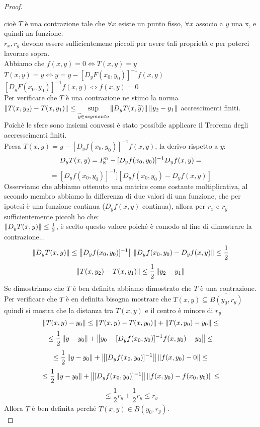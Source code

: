 \begin{theorem}
\begin{proof}
\begin{enumerate}
		\end{enumerate}
		cioè $T$ è una contrazione tale che $\forall x$ esiste un punto fisso, $\forall x$ associo a $y$ una x, e quindi na funzione.\\
		$r_x,r_y$ devono essere sufficientemene piccoli per avere tali proprietà e per poterci lavorare sopra.\\
		Abbiamo che $f(x,y)=0 \Leftrightarrow T(x,y)=y$\\
		$T(x,y)=y\Leftrightarrow y=y-[D_yF(x_0,y_0)]^{-1}f(x,y)$\\
		$[D_yF(x_0,y_0)]^{-1}f(x,y)\Leftrightarrow f(x,y)=0$\\
		Per verificare che $T$ è una contrazione ne stimo la norma\\
		$\left\|T(x,y_2)-T(x,y_1)\right\| \le \sup\limits_{\widetilde{y}\in segmento}\left\|D_yT(x,\widetilde{y})\right\|\left\|y_2-y_1\right\| $  accrescimenti finiti.\\
		Poichè le sfere sono insiemi convessi è stato possibile applicare il Teorema degli accresscimenti finiti.\\
		Presa $T(x,y) = y-[D_yf(x_0,y_0)]^{-1}f(x,y)$, la derivo rispetto a $y$:
		$$D_yT(x,y)= I_{\mathbb{R}}^m-[D_yf(x_0,y_0)]^{-1}D_yf(x,y) = $$
		$$=[D_yf(x_0,y_0)]^{-1}][D_yf(x_0,y_0)-D_yf(x,y)]$$
		Osserviamo che abbiamo ottenuto una matrice come costante moltiplicativa, al secondo membro abbiamo la differenza di due valori di una funzione, che per ipotesi è una funzione continua ($D_yf(x,y)$ continua), allora per $r_x$ e $r_y$ sufficientemente piccoli ho che:\\
		$\left\|D_yT(x,y)\right\| \le \frac{1}{2}$, è scelto questo valore poiché è comodo al fine di dimostrare la contrazione...\\
		$$\left\|D_yT(x,y)\right\| \le \left\|D_yf(x_0,y_0)]^{-1}\right\| \left\|D_yf(x_0,y_0)-D_yf(x,y)\right\|\le\frac{1}{2} $$  
		$$\left\|T(x,y_2)-T(x,y_1)\right\|\le\frac{1}{2}\left\|y_2-y_1\right\| $$
		Se dimostriamo che $T$ è ben definita abbiamo dimostrato che $T$ è una contrazione.\\
		Per verificare che $T$ è en definita bisogna mostrare che $T(x,y)\subseteq\overline{B(y_0,r_y)}$ quindi si mostra che la distanza tra $T(x,y)$ e il centro è minore di $r_y$
		$$\left\|T(x,y) - y_0\right\|\le\left\|T(x,y)-T(x,y_0)\right\|+\left\|T(x,y_0)-y_0\right\| \le$$
		$$\le\frac{1}{2}\left\|y-y_0\right\|+\left\|y_0-[D_yf(x_0,y_0)]^{-1}f(x,y_0)-y_0\right\|\le$$
		$$\le\frac{1}{2}\left\|y-y_0\right\|+\left\|[D_yf(x_0,y_0)]^{-1}\right\| \left\|f(x,y_0)-0\right\|\le$$
		$$\le\frac{1}{2}\left\|y-y_0\right\|+\left\|[D_yf(x_0,y_0)]^{-1}\right\| \left\|f(x,y_0)-f(x_0,y_0)\right\|\le$$
		$$\le\frac{1}{2}r_y+\frac{1}{2}r_y\le r_y$$
		Allora $T$ è ben definita perché $T(x,y)\in\overline{B(y_0,r_y)}$.\\

\end{proof}
\end{theorem}
